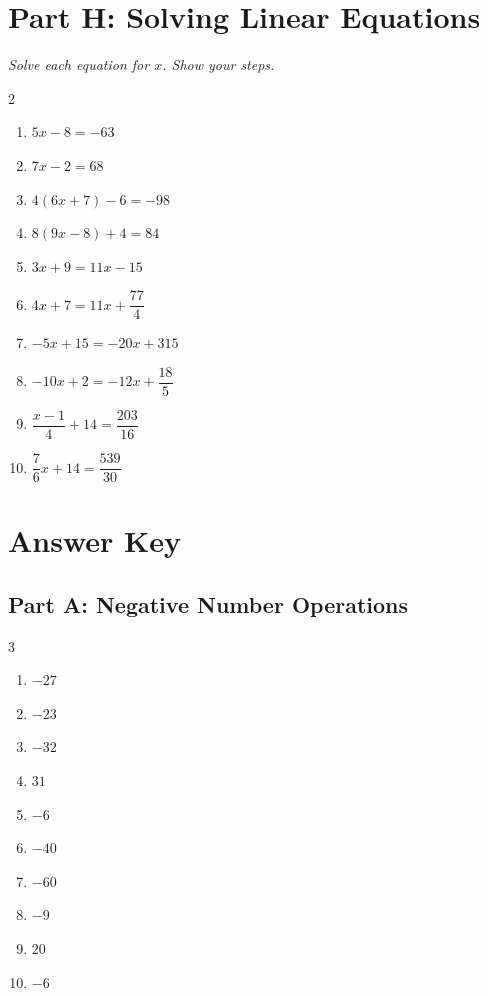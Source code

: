 \documentclass[11pt]{article}
\begin{document}
\section*{Part H: Solving Linear Equations}
\noindent\textit{Solve each equation for $x$. Show your steps.}
\begin{multicols}{2}
\begin{enumerate}
  \item $5x - 8 = -63$
  \vspace{2.0cm}
  \item $7x - 2 = 68$
  \vspace{2.0cm}
  \item $4(6x + 7) - 6 = -98$
  \vspace{2.0cm}
  \item $8(9x - 8) + 4 = 84$
  \vspace{2.0cm}
  \item $3x + 9 = 11x - 15$
  \vspace{2.0cm}
  \item $4x + 7 = 11x + \dfrac{77}{4}$
  \vspace{2.0cm}
  \item $-5x + 15 = -20x + 315$
  \vspace{2.0cm}
  \item $-10x + 2 = -12x + \dfrac{18}{5}$
  \vspace{2.0cm}
  \item $\dfrac{x - 1}{4} + 14 = \dfrac{203}{16}$
  \vspace{2.0cm}
  \item $\dfrac{7}{6}x + 14 = \dfrac{539}{30}$
  \vspace{2.0cm}
\end{enumerate}
\end{multicols}

\newpage
{}
\section*{Answer Key}
\subsection*{Part A: Negative Number Operations}
\begin{multicols}{3}
\begin{enumerate}
  \item $-27$
  \item $-23$
  \item $-32$
  \item $31$
  \item $-6$
  \item $-40$
  \item $-60$
  \item $-9$
  \item $20$
  \item $-6$
\end{enumerate}
\end{multicols}
\end{document}
